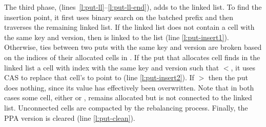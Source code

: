 The third phase, (lines~\ref{l:put-ll}--\ref{l:put-ll-end}), adds  to the linked list.
To find the insertion point, it first uses binary search on the batched prefix and then traverses the remaining linked list.
If the linked list does not contain a cell with the same key and version, then  is linked to the list (line \ref{l:put-insert1}).
Otherwise, ties between two puts with the same key and version are broken based on the indices of their allocated cells in .
If the put that allocates cell  finds in the linked list a cell with index  with the same key and version such that $<$,
it uses CAS to replace that cell's  to point to  (line \ref{l:put-insert2}).
If $>$ then the put does nothing, since its value has effectively been overwritten.
Note that in both cases some cell, either  or , remains allocated but is not connected to the linked list.
Unconnected cells are compacted by the  rebalancing process.
Finally, the PPA version is cleared (line \ref{l:put-clean}).


